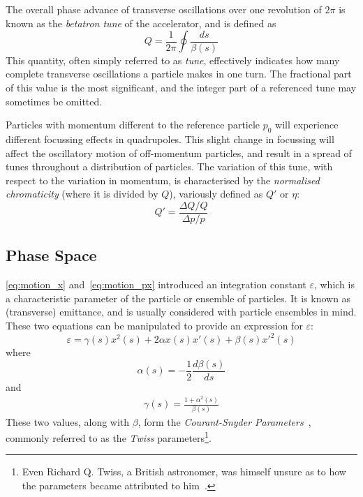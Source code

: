 \documentclass[a4paper,twoside,11pt]{report}
\begin{document}
The overall phase advance of transverse oscillations over one revolution of $2\pi$ is known as the \textit{betatron tune} of the accelerator, and is defined as
\begin{equation}
  Q=\frac1{2\pi}\oint\frac{ds}{\beta(s)}
  \label{eq:betatron_tune}
\end{equation}
This quantity, often simply referred to as \textit{tune}, effectively indicates how many complete transverse oscillations a particle makes in one turn. The fractional part of this value is the most significant, and the integer part of a referenced tune may sometimes be omitted.

Particles with momentum different to the reference particle $p_0$ will experience different focussing effects in quadrupoles. This slight change in focussing will affect the oscillatory motion of off-momentum particles, and result in a spread of tunes throughout a distribution of particles. The variation of this tune, with respect to the variation in momentum, is characterised by the \textit{normalised chromaticity} (where it is divided by $Q$), variously defined as $Q'$ or $\eta$:
\begin{equation}
  Q' = \frac{\Delta Q/Q}{\Delta p/p}
  \label{eq:chroma}
\end{equation}

\subsection{Phase Space}\label{subsec:trans_phase_space}

\autoref{eq:motion_x} and~\autoref{eq:motion_px} introduced an integration constant $\varepsilon$, which is a characteristic parameter of the particle or ensemble of particles. It is known as (transverse) emittance, and is usually considered with particle ensembles in mind. These two equations can be manipulated to provide an expression for $\varepsilon$:
\begin{equation}
  \varepsilon = \gamma(s)x^2(s)+2\alpha x(s)x'(s)+\beta(s)x'^2(s)
  \label{eq:emittance}
\end{equation} where 
\begin{equation}
  \alpha(s) = -\frac12\frac{d\beta(s)}{ds}
  \label{eq:alpha}
\end{equation} and
\begin{eqnarray}
  \gamma(s) = \frac{1+\alpha^2(s)}{\beta(s)}
  \label{eq:gamma}
\end{eqnarray}
These two values, along with $\beta$, form the \textit{Courant-Snyder Parameters}~\cite{courantsnyder}, commonly referred to as the \textit{Twiss} parameters\footnote{Even Richard Q. Twiss, a British astronomer, was himself unsure as to how the parameters became attributed to him~\cite{richardtwiss}.}. 
\end{document}
